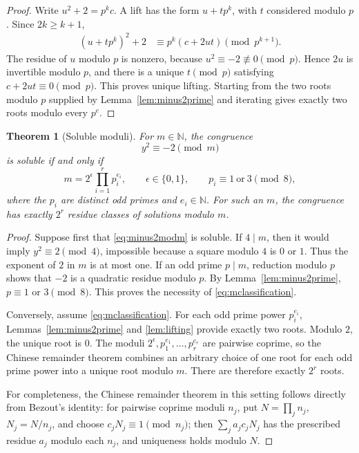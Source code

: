 \documentclass[11pt,a4paper]{amsart}
\numberwithin{equation}{section}
\newtheorem{theorem}{Theorem}[section]
\theoremstyle{definition}
\newcommand{\N}{\mathbb N}
\begin{document}
\begin{proof}
Write \(u^2+2=p^kc\).  A lift has the form \(u+tp^k\), with
\(t\) considered modulo \(p\).  Since \(2k\ge k+1\),
\begin{align*}
 (u+tp^k)^2+2
 &\equiv p^k(c+2ut)\pmod{p^{k+1}}.
\end{align*}
The residue of \(u\) modulo \(p\) is nonzero, because
\(u^2\equiv-2\not\equiv0\pmod p\).  Hence \(2u\) is invertible modulo
\(p\), and there is a unique \(t\pmod p\) satisfying
\(c+2ut\equiv0\pmod p\).  This proves unique lifting.  Starting from
the two roots modulo \(p\) supplied by Lemma~\ref{lem:minus2prime}
and iterating gives exactly two roots modulo every \(p^e\).
\end{proof}

\begin{theorem}[Soluble moduli]\label{thm:moduli}
For \(m\in\N\), the congruence
\begin{equation}
 y^2\equiv-2\pmod m
 \label{eq:minus2modm}
\end{equation}
is soluble if and only if
\begin{equation}
 m=2^{\epsilon}\prod_{i=1}^r p_i^{e_i},
 \qquad
 \epsilon\in\{0,1\},
 \qquad
 p_i\equiv1\ \text{or}\ 3\pmod8,
 \label{eq:mclassification}
\end{equation}
where the \(p_i\) are distinct odd primes and \(e_i\in\N\).
For such an \(m\), the congruence has exactly \(2^r\) residue classes
of solutions modulo \(m\).
\end{theorem}

\begin{proof}
Suppose first that \eqref{eq:minus2modm} is soluble.  If \(4\mid m\),
then it would imply \(y^2\equiv2\pmod4\), impossible because a square
modulo \(4\) is \(0\) or \(1\).  Thus the exponent of \(2\) in \(m\)
is at most one.  If an odd prime \(p\mid m\), reduction modulo \(p\)
shows that \(-2\) is a quadratic residue modulo \(p\).  By
Lemma~\ref{lem:minus2prime}, \(p\equiv1\) or \(3\pmod8\).  This proves
the necessity of \eqref{eq:mclassification}.

Conversely, assume \eqref{eq:mclassification}.  For each odd prime
power \(p_i^{e_i}\), Lemmas~\ref{lem:minus2prime} and
\ref{lem:lifting} provide exactly two roots.  Modulo \(2\), the unique
root is \(0\).  The moduli \(2^{\epsilon},p_1^{e_1},\ldots,p_r^{e_r}\)
are pairwise coprime, so the Chinese remainder theorem combines an
arbitrary choice of one root for each odd prime power into a unique
root modulo \(m\).  There are therefore exactly \(2^r\) roots.

For completeness, the Chinese remainder theorem in this setting
follows directly from Bezout's identity: for pairwise coprime moduli
\(n_j\), put \(N=\prod_j n_j\), \(N_j=N/n_j\), and choose
\(c_jN_j\equiv1\pmod{n_j}\); then
\(\sum_j a_jc_jN_j\) has the prescribed residue \(a_j\) modulo each
\(n_j\), and uniqueness holds modulo \(N\).
\end{proof}
\end{document}
